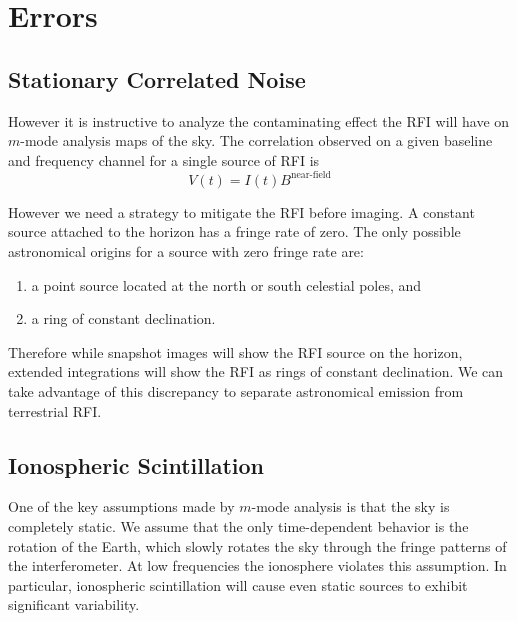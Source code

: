 \documentclass[twocolumn]{aastex6}
\begin{document}
\section{Errors}

\subsection{Stationary Correlated Noise}

However it is instructive to analyze the contaminating effect the RFI will have
on $m$-mode analysis maps of the sky. The correlation observed on a given
baseline and frequency channel for a single source of RFI is
\begin{equation}
    V(t) = I(t) B^\textrm{near-field}
\end{equation}

However we need a strategy to mitigate the RFI before imaging. A constant source attached to the
horizon has a fringe rate of zero. The only possible astronomical origins for a source with zero
fringe rate are:

\begin{enumerate}
    \item a point source located at the north or south celestial poles, and
    \item a ring of constant declination.
\end{enumerate}

Therefore while snapshot images will show the RFI source on the horizon, extended integrations will
show the RFI as rings of constant declination. We can take advantage of this discrepancy to separate
astronomical emission from terrestrial RFI.




\subsection{Ionospheric Scintillation}

One of the key assumptions made by $m$-mode analysis is that the sky is completely static.  We
assume that the only time-dependent behavior is the rotation of the Earth, which slowly rotates the
sky through the fringe patterns of the interferometer. At low frequencies the ionosphere violates
this assumption. In particular, ionospheric scintillation will cause even static sources to exhibit
significant variability.
\end{document}
